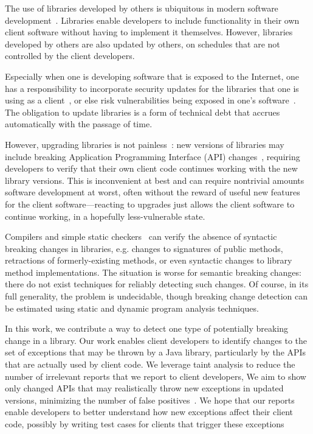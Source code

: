 The use of libraries developed by others is ubiquitous in modern
software development~\cite{huang22:_charac_java,wang20:_java}. Libraries enable developers to include
functionality in their own client software without having to
implement it themselves.  However, libraries developed by others are
also updated by others, on schedules that are not controlled by the client developers.

Especially when one is developing software that is exposed to the Internet, one
has a responsibility to incorporate security updates for the
libraries that one is using as a client~\cite{wu23:_under_threat_upstr_vulner_downs}, or else risk vulnerabilities
being exposed in one's software~\cite{haryono22:_autom_ident_librar_vulner_data,zhan21:_atvhun,alfadel23:_empir_python}. The obligation to update libraries is
a form of technical debt that accrues automatically with the passage
of time.

However, upgrading libraries is not painless~\cite{elizalde18:_towar_smoot_librar_migrat,derr17:_keep,dann23:_upcy}: new
versions of libraries may include breaking Application Programming
Interface (API) changes~\cite{dietrich14:_broken}, requiring developers to verify that their own client
code continues working with the new library versions. This is
inconvenient at best and can require nontrivial amounts software development at worst,
often without the reward of useful new features for the client software---reacting to upgrades
just allows the client software to continue working, in a hopefully less-vulnerable
state.

Compilers and simple static
checkers~\cite{brito18:_apidif,foo18:_effic_static_check_librar_updat}
can verify the absence of syntactic breaking changes in libraries,
e.g. changes to signatures of public methods, retractions of
formerly-existing methods, or even syntactic changes to library method
implementations. The situation is worse for semantic breaking changes:
there do not exist techniques for reliably detecting such changes. Of
course, in its full generality, the problem is undecidable, though
breaking change detection can be estimated using static and dynamic program analysis
techniques.

In this work, we contribute a way to detect one type of potentially breaking
change in a library. Our work enables client developers to identify changes
to the set of exceptions that may be thrown by a Java library, particularly
by the APIs that are actually used by client code. We leverage taint analysis
to reduce the number of irrelevant reports that we report to client developers,
We aim to show only changed APIs that may realistically throw new exceptions
in updated versions, minimizing the number of false positives~\cite{pashchenko20:_vuln4,pashchenko18:_vulner}.
We hope that our reports enable developers to better understand how new exceptions affect their client code,
possibly by writing test cases for clients that trigger these exceptions 

